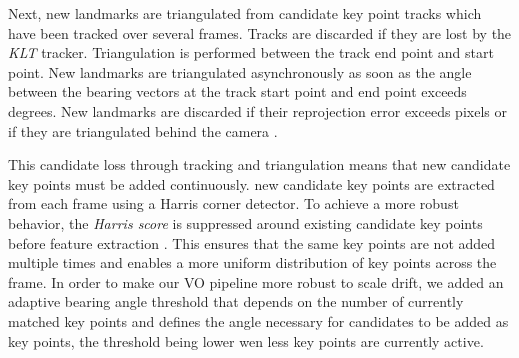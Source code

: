Next, new landmarks are triangulated from candidate key point tracks which have been tracked over several frames. 
Tracks are discarded if they are lost by the \emph{KLT} tracker.
Triangulation is performed between the track end point and start point. 
New landmarks are triangulated asynchronously as soon as the angle between the bearing vectors at the track start point and end point exceeds \triangulationAngleThreshold degrees. 
New landmarks are discarded if their reprojection error exceeds \triangulationMaxReprError pixels or if they are triangulated behind the camera . \par 
This candidate loss through tracking and triangulation means that new candidate key points must be added continuously. 
\addCandidateEachFrame new candidate key points are extracted from each frame using a Harris corner detector. 
To achieve a more robust behavior, the \emph{Harris score} is suppressed around existing candidate key points before feature extraction . This ensures that the same key points are not added multiple times and enables a more uniform distribution of key points across the frame. 
In order to make our VO pipeline more robust to scale drift, we added an adaptive bearing angle threshold that depends on the number of currently matched key points and defines the angle necessary for candidates to be added as key points, the threshold being lower wen less key points are currently active.